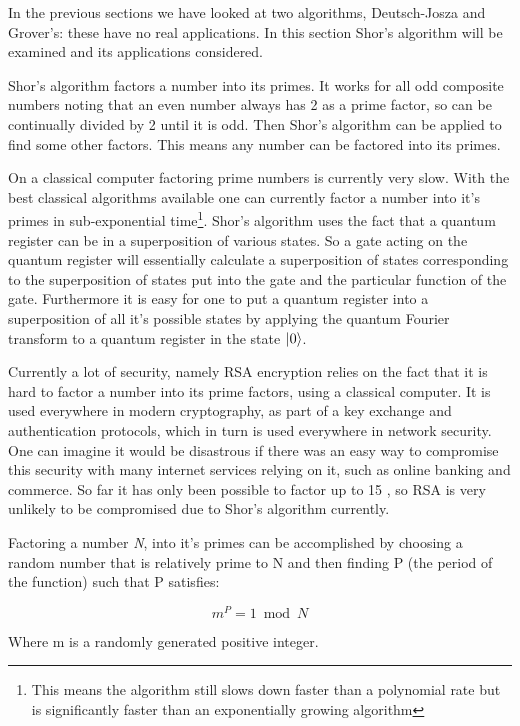 In the previous sections we have looked at two algorithms, Deutsch-Josza and Grover's: these have no real applications. In this section Shor's algorithm will be examined and its applications considered.

Shor's algorithm factors a number into its primes. It works for all odd composite numbers noting that an even number always has 2 as a prime factor, so can be continually divided by 2 until it is odd. Then Shor's algorithm can be applied to find some other factors. This means any number can be factored into its primes.

On a classical computer factoring prime numbers is currently very slow. With the best classical algorithms available one can currently factor a number into it’s primes in sub-exponential time\footnote{This means the algorithm still slows down faster than a polynomial rate but is significantly faster than an exponentially growing algorithm}.  Shor's algorithm uses the fact that a quantum register can be in a superposition of various states. So a gate acting on the quantum register will essentially calculate a superposition of states corresponding to the superposition of states put into the gate and the particular function of the gate. Furthermore it is easy for one to put a quantum register into a superposition of all it’s possible states by applying the quantum Fourier transform to a quantum register in the state \(\left| 0 \right>\). 

Currently a lot of security, namely RSA encryption relies on the fact that it is hard to factor a number into its prime factors, using a classical computer. It is used everywhere in modern cryptography, as part of a key exchange and authentication protocols, which in turn is used everywhere in network security. One can imagine it would be disastrous if there was an easy way to compromise this security with many internet services relying on it, such as online banking and commerce. So far it has only been possible to factor up to 15 \cite{expdemo,demoshor}, so RSA is very unlikely to be compromised due to Shor's algorithm currently.

Factoring a number \emph{N}, into it’s primes can be accomplished by choosing a random number that is relatively prime to N and then finding P (the period of the function) such that P satisfies:

\begin{equation}
 m^P = 1 \bmod N
\end{equation}

Where m is a randomly generated positive integer.

